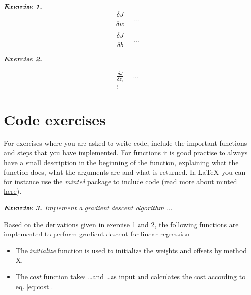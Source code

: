 \documentclass[a4paper,10pt]{article}
\begin{document}
\textit{\textbf{Exercise 1.}}
\begin{equation*}
    \frac{\delta J}{\delta w} = ...
\end{equation*}

\begin{equation*}
    \frac{\delta J}{\delta b} = ...
\end{equation*}


\textit{\textbf{Exercise 2.}}

\begin{equation*}
\begin{split}
    \frac{\delta J}{\delta z_i} = ... \\
    \vdots
\end{split}
\end{equation*}


\section{Code exercises}

For exercises where you are asked to write code, include the important functions and steps that you have implemented. For functions it is good practise to always have a small description in the beginning of the function, explaining what the function does, what the arguments are and what is returned. In \LaTeX\ you can for instance use the \emph{minted} package to include code 
(read more about minted \href{https://www.overleaf.com/learn/latex/Code_Highlighting_with_minted}{here}).


\hfill \break
\textit{\textbf{Exercise 3.} Implement a gradient descent algorithm ...}

Based on the derivations given in exercise 1 and 2, the following functions are implemented to perform gradient descent for linear regression. 

\begin{itemize}
\item
The \emph{initialize} function is used to initialize the weights and offsets by method X.
\item
The \emph{cost} function takes \ldots and \ldots as input and calculates the cost according to eq. \eqref{eq:cost}.
\end{itemize}
\end{document}
